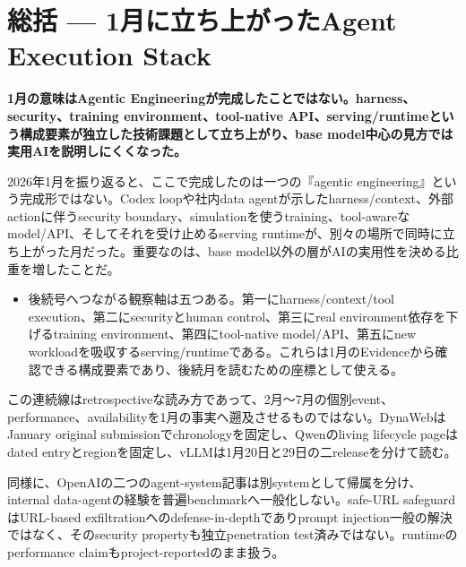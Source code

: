 \section{総括 — 1月に立ち上がったAgent Execution Stack}
\label{pkg:closing-synthesis}
\noindent\textbf{1月の意味はAgentic Engineeringが完成したことではない。harness、security、training environment、tool-native API、serving/runtimeという構成要素が独立した技術課題として立ち上がり、base model中心の見方では実用AIを説明しにくくなった。}\autocite{src-0d2abbb0fa62,src-3bc80a3c7870,src-85bc3e4f7b39,src-ae10eb4597fe,src-eac8dfbeb78c}

2026年1月を振り返ると、ここで完成したのは一つの『agentic engineering』という完成形ではない。Codex loopや社内data agentが示したharness/context、外部actionに伴うsecurity boundary、simulationを使うtraining、tool-awareなmodel/API、そしてそれを受け止めるserving runtimeが、別々の場所で同時に立ち上がった月だった。重要なのは、base model以外の層がAIの実用性を決める比重を増したことだ。\autocite{src-0d2abbb0fa62,src-3bc80a3c7870,src-85bc3e4f7b39,src-ae10eb4597fe,src-eac8dfbeb78c,src-fa5410010e0a}


\begin{itemize}
  \item 後続号へつながる観察軸は五つある。第一にharness/context/tool execution、第二にsecurityとhuman control、第三にreal environment依存を下げるtraining environment、第四にtool-native model/API、第五にnew workloadを吸収するserving/runtimeである。これらは1月のEvidenceから確認できる構成要素であり、後続月を読むための座標として使える。
\end{itemize}
\autocite{src-0d2abbb0fa62,src-85bc3e4f7b39,src-ae10eb4597fe,src-d9f9de620203,src-eac8dfbeb78c}

\begin{claimboundary}
この連続線はretrospectiveな読み方であって、2月〜7月の個別event、performance、availabilityを1月の事実へ遡及させるものではない。DynaWebはJanuary original submissionでchronologyを固定し、Qwenのliving lifecycle pageはdated entryとregionを固定し、vLLMは1月20日と29日の二releaseを分けて読む。\autocite{src-3bc80a3c7870,src-85bc3e4f7b39,src-d9f9de620203,src-eac8dfbeb78c}
\end{claimboundary}

\begin{claimboundary}
同様に、OpenAIの二つのagent-system記事は別systemとして帰属を分け、internal data-agentの経験を普遍benchmarkへ一般化しない。safe-URL safeguardはURL-based exfiltrationへのdefense-in-depthでありprompt injection一般の解決ではなく、そのsecurity propertyも独立penetration test済みではない。runtimeのperformance claimもproject-reportedのまま扱う。\autocite{src-0d2abbb0fa62,src-3bc80a3c7870,src-ae10eb4597fe,src-d9f9de620203,src-fa5410010e0a}
\end{claimboundary}

